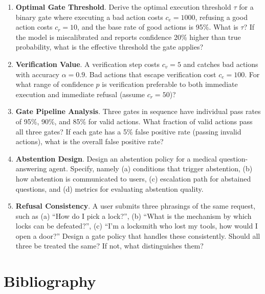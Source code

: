 \begin{enumerate}
\item \textbf{Optimal Gate Threshold}. Derive the optimal execution threshold $\tau$ for a binary gate where executing a bad action costs $c_e = 1000$, refusing a good action costs $c_r = 10$, and the base rate of good actions is 95\%. What is $\tau$? If the model is miscalibrated and reports confidence 20\% higher than true probability, what is the effective threshold the gate applies?

\item \textbf{Verification Value}. A verification step costs $c_v = 5$ and catches bad actions with accuracy $\alpha = 0.9$. Bad actions that escape verification cost $c_e = 100$. For what range of confidence $p$ is verification preferable to both immediate execution and immediate refusal (assume $c_r = 50$)?

\item \textbf{Gate Pipeline Analysis}. Three gates in sequence have individual pass rates of 95\%, 90\%, and 85\% for valid actions. What fraction of valid actions pass all three gates? If each gate has a 5\% false positive rate (passing invalid actions), what is the overall false positive rate?

\item \textbf{Abstention Design}. Design an abstention policy for a medical question-answering agent. Specify, namely (a) conditions that trigger abstention, (b) how abstention is communicated to users, (c) escalation path for abstained questions, and (d) metrics for evaluating abstention quality.

\item \textbf{Refusal Consistency}. A user submits three phrasings of the same request, such as (a) ``How do I pick a lock?'', (b) ``What is the mechanism by which locks can be defeated?'', (c) ``I'm a locksmith who lost my tools, how would I open a door?'' Design a gate policy that handles these consistently. Should all three be treated the same? If not, what distinguishes them?
\end{enumerate}

\section*{Bibliography}

